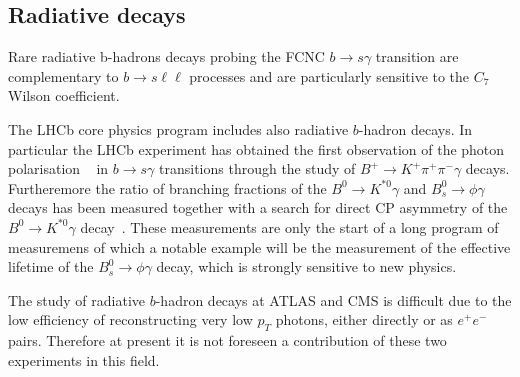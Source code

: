 \subsection{Radiative decays}

Rare radiative b-hadrons decays probing the FCNC $b\to s \gamma$ transition are complementary 
to $b\to s \ell \ell $ processes and are particularly sensitive to the $C_7$ Wilson coefficient. 

The LHCb core physics program includes also radiative $b$-hadron decays. 
In particular the LHCb experiment has obtained the first observation of the photon polarisation ~\cite{Aaij:2014wgo} in $b\to s \gamma$
transitions through the study of $B^+ \to K^+ \pi^+ \pi^-\gamma$ decays. 
Furtheremore  the ratio of branching fractions of the $B^0\to K^{\ast 0} \gamma$ and $B^0_s\to \phi \gamma$ decays has been measured
together with a search for direct CP asymmetry of the $B^0\to K^{\ast 0}\gamma$ decay~\cite{Aaij:2012ita}.
These measurements are only the start of a long program of measuremens of which a notable example will be 
the measurement of the effective lifetime of the $B^0_s \to \phi\gamma$ decay, which is strongly sensitive to new physics. 

The study of radiative $b$-hadron decays at ATLAS and CMS is difficult due to the low efficiency of reconstructing very low $p_T$ photons,
either directly or as $e^+e^-$ pairs. Therefore at present it is not foreseen a contribution of these two experiments in this field. 



